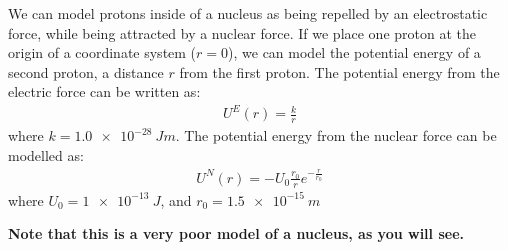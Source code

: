 \question We can model protons inside of a nucleus as being repelled by an electrostatic force, while being attracted by a nuclear force. If we place one proton at the origin of a coordinate system ($r=0$), we can model the potential energy of a second proton, a distance $r$ from the first proton. The potential energy from the electric force can be written as:
\begin{align*}
U^E(r) = \frac{k}{r}
\end{align*}
where $k=\SI{1.0e-28}{Jm}$. The potential energy from the nuclear force can be modelled as:
\begin{align*}
U^N(r) = -U_0\frac{r_0}{r}e^{-\frac{r}{r_0}}
\end{align*}
where $U_0=\SI{1e-13}{J}$, and $r_0=\SI{1.5e-15}{m}$
\textbf{Note that this is a very poor model of a nucleus, as you will see.}

